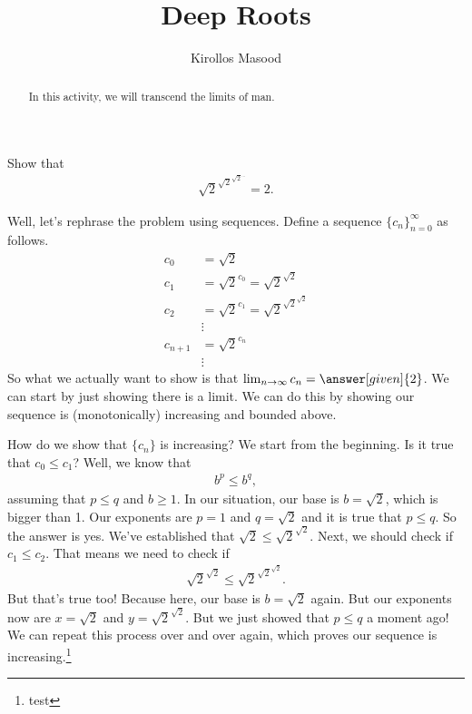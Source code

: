 \documentclass{ximera}
\title{Deep Roots}
\author{Kirollos Masood}
\begin{document}
\begin{abstract}
In this activity, we will transcend the limits of man.
\end{abstract}
\maketitle

\begin{exercise}
	Show that
	\begin{align*}
		\sqrt{2}^{\sqrt{2}^{\sqrt{2}^{\ldots}}  }=2.
	\end{align*}
	
	Well, let's rephrase the problem using sequences. Define a sequence $\{c_n\}_{n=0}^{\infty}$ as follows.
	\begin{align*}
		c_0 &=\sqrt{2} \\
		c_1 &=\sqrt{2}^{c_0}=\sqrt{2}^{\sqrt{2}} \\
		c_2 &=\sqrt{2}^{c_1}=\sqrt{2}^{\sqrt{2}^{\sqrt{2}}} \\
		&\vdots \\
		c_{n+1}&=\sqrt{2}^{c_n} \\
		&\vdots
	\end{align*}
	So what we actually want to show is that $\lim_{n \to \infty} c_n = \answer[given]{2}$. We can start by just showing there is a limit. We can do this by showing our sequence is (monotonically) increasing and bounded above.
	
	\begin{exercise}
		How do we show that $\{c_n\}$ is increasing? We start from the beginning. Is it true that $c_0 \leq c_1$? Well, we know that
		\begin{align*}
			b^p \leq b^q,
		\end{align*}
		assuming that $p\leq q$ and $b\geq 1$. In our situation, our base is $b=\sqrt{2}$, which is bigger than 1. Our exponents are $p=1$ and $q=\sqrt{2}$ and it is true that $p\leq q$. So the answer is yes. We've established that $\sqrt{2} \leq \sqrt{2}^{\sqrt{2}}$. Next, we should check if $c_1 \leq c_2$. That means we need to check if 
		\begin{align*}
			\sqrt{2}^{\sqrt{2}} \leq \sqrt{2}^{\sqrt{2}^{\sqrt{2}}}.
		\end{align*}
		But that's true too! Because here, our base is $b=\sqrt{2}$ again. But our exponents now are $x=\sqrt{2}$ and $y=\sqrt{2}^{\sqrt{2}}$. But we just showed that $p\leq q$ a moment ago! We can repeat this process over and over again, which proves our sequence is increasing.\footnote{test}
	\end{exercise}
	

\end{exercise}
\end{document}
